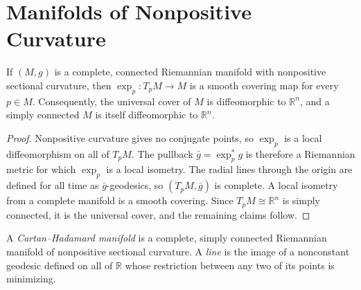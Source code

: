 \section{Manifolds of Nonpositive Curvature}

\begin{theorem}
\label{thm:cartan-hadamard}
\leanok
{}
If $(M,g)$ is a complete, connected Riemannian manifold with nonpositive
sectional curvature, then $\exp_p:T_pM\to M$ is a smooth covering map for
every $p\in M$.  Consequently, the universal cover of $M$ is diffeomorphic to
$\mathbb R^n$, and a simply connected $M$ is itself diffeomorphic to
$\mathbb R^n$.
\begin{proof}
\sketch Nonpositive curvature gives no conjugate points, so $\exp_p$ is a
local diffeomorphism on all of $T_pM$.  The pullback $\bar g=\exp_p^*g$ is
therefore a Riemannian metric for which $\exp_p$ is a local isometry.  The
radial lines through the origin are defined for all time as $\bar g$-geodesics,
so $(T_pM,\bar g)$ is complete.  A local isometry from a complete manifold is
a smooth covering.  Since $T_pM\cong\mathbb R^n$ is simply connected, it is
the universal cover, and the remaining claims follow.
\end{proof}
\end{theorem}

A \emph{Cartan--Hadamard manifold} is a complete, simply connected Riemannian
manifold of nonpositive sectional curvature.  A \emph{line} is the image of a
nonconstant geodesic defined on all of $\mathbb R$ whose restriction between
any two of its points is minimizing.

